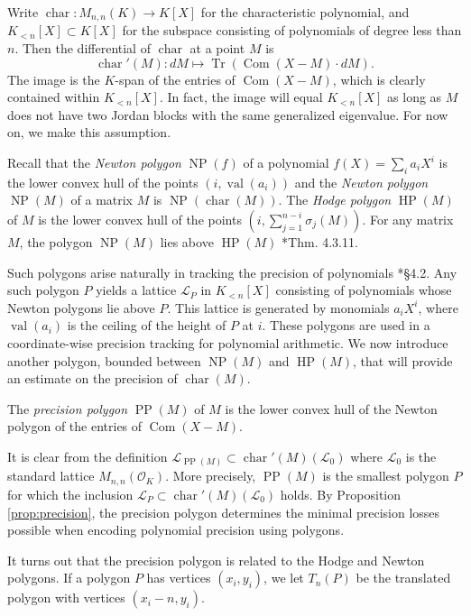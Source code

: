 \documentclass{sig-alternate}
\DeclareMathOperator{\NP}{NP}
\DeclareMathOperator{\HP}{HP}
\DeclareMathOperator{\PP}{PP}
\DeclareMathOperator{\val}{val}
\DeclareMathOperator{\tr}{Tr}
\DeclareMathOperator{\com}{Com}
\newcommand{\OK}{\mathcal{O}_K}
\DeclareMathOperator{\charpoly}{char}
\newcommand{\charp}{\charpoly'}
\begin{document}
Write $\charpoly : M_{n,n}(K) \to K[X]$ for the characteristic 
polynomial, and $K_{<n}[X] \subset K[X]$ for the subspace consisting of 
polynomials of degree less than $n$.  Then the differential of 
$\charpoly$ at a point $M$ is
\[
\charp(M) : dM \mapsto \tr(\com(X - M) \cdot dM).
\]
The image is the $K$-span of the entries of $\com(X{-}M)$, which is 
clearly contained within $K_{<n}[X]$.  In fact, the image will equal 
$K_{<n}[X]$ as long as $M$ does not have two Jordan blocks with the same 
generalized eigenvalue. For now on, we make this assumption.

Recall that the \emph{Newton polygon} $\NP(f)$ of a polynomial $f(X) = 
\sum_{i} a_i X^i$ is the lower convex hull of the points $(i, 
\val(a_i))$ and the \emph{Newton polygon} $\NP(M)$ of a matrix $M$ is 
$\NP(\charpoly(M))$.  The \emph{Hodge polygon} $\HP(M)$ of $M$ is the lower 
convex hull of the points $(i, \sum_{j = 1}^{n-i} \sigma_j(M))$. For 
any matrix $M$, the polygon $\NP(M)$ lies above $\HP(M)$ 
\cite{kedlaya:padicDiffEq}*{Thm. 4.3.11}.

Such polygons arise naturally in tracking the precision of polynomials 
\cite{caruso-roe-vaccon:14a}*{\S 4.2}.  Any such polygon $P$ yields a 
lattice $\mathcal{L}_P$ in $K_{<n}[X]$ consisting of polynomials whose 
Newton polygons lie above $P$.  This lattice is generated by monomials 
$a_iX^i$, where $\val(a_i)$ is the ceiling of the height of $P$ at $i$.  
These polygons are used in a coordinate-wise precision tracking for polynomial
arithmetic. We now introduce another polygon, bounded 
between $\NP(M)$ and $\HP(M)$, that will provide an estimate on the precision of $\charpoly(M)$.

\begin{deftn}
The \emph{precision polygon} $\PP(M)$ of $M$ is the lower convex hull of 
the Newton polygon of the entries of $\com(X{-}M)$.
\end{deftn}

It is clear from the definition $\mathcal L_{\PP(M)} \subset 
\charp(M)(\mathcal{L}_0)$ where $\mathcal{L}_0$ is the standard lattice 
$M_{n,n}(\OK)$. More precisely, $\PP(M)$ is the smallest polygon $P$ for 
which the inclusion $\mathcal L_P \subset \charp(M)(\mathcal{L}_0)$ holds. By 
Proposition \ref{prop:precision}, the precision polygon determines the minimal 
precision losses possible when encoding polynomial precision using polygons.

It turns out that the precision polygon is related to the Hodge and Newton 
polygons. If a polygon $P$ has vertices $(x_i, y_i)$, we let $T_n(P)$ be 
the translated polygon with vertices $(x_i - n, y_i)$.
\end{document}
